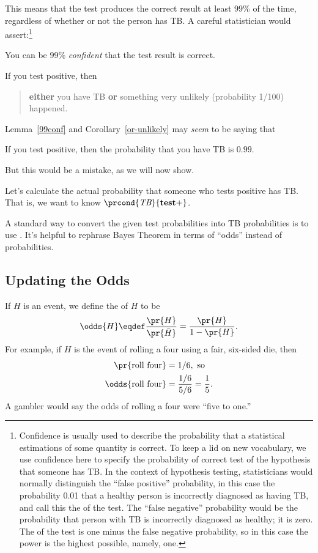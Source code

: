This means that the test produces the correct result at least 99\% of
the time, regardless of whether or not the person has TB.  A careful
statistician would assert:\footnote{Confidence is usually used to describe
  the probability that a statistical estimations of some quantity is
  correct.  To keep a lid on new vocabulary, we use confidence here to
  specify the probability of correct test of the hypothesis that
  someone has TB.  In the context of hypothesis testing,
  statisticians would normally distinguish the ``false positive''
  probability, in this case the probability 0.01 that a healthy person
  is incorrectly diagnosed as having TB, and call this the
   of the test.  The ``false negative'' probability
  would be the probability that person with TB is incorrectly
  diagnosed as healthy; it is zero.  The  of the test is
  one minus the false negative probability, so in this case the power
  is the highest possible, namely, one.}
\begin{lemma*}\label{99conf}
You can be 99\% \emph{confident} that the test result is correct.
\end{lemma*}
\begin{corollary}\label{or-unlikely}
If you test positive, then
\begin{quote}
\textbf{either} you have TB \textbf{or} something very unlikely
(probability 1/100) happened.
\end{quote}
\end{corollary}
Lemma~\ref{99conf} and Corollary~\ref{or-unlikely} may \emph{seem} to
be saying that
\begin{falseclm*}
If you test positive, then the probability that you have TB is $0.99$.
\end{falseclm*}
But this would be a mistake, as we will now show.

Let's calculate the actual probability that someone who tests positive
has TB.  That is, we want to know $\prcond{\TB}{\testplus}$.

A standard way to convert the given test probabilities into TB
probabilities is to use .  It's helpful to rephrase
Bayes Theorem in terms of ``odds'' instead of probabilities.

\subsection{Updating the Odds}
If $H$ is an event, we define the  of $H$ to be
\[
\odds{H} \eqdef \frac{\pr{H}}{\pr{\bar{H}}} = \frac{\pr{H}}{1-\pr{H}}.
\]
For example, if $H$ is the event of rolling a four using a fair,
six-sided die, then
\begin{align*}
\pr{\text{roll four}} & = 1/6,\text{ so}\\
\odds{\text{roll four}} & = \frac{1/6}{5/6} = \frac{1}{5}.
\end{align*}
A gambler would say the odds of rolling a four were ``five to one.''

